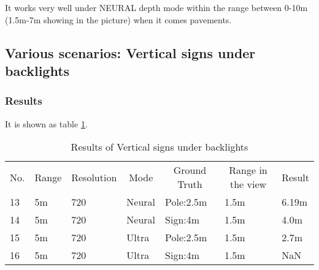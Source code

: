It works very well under NEURAL depth mode within the range between 0-10m (1.5m-7m showing in the picture) when it comes pavements. 

\subsection{Various scenarios: Vertical signs under backlights}

\subsubsection{Results}

It is shown as table \ref{fig:backlights}.

\begin{table}[]
  \begin{tabular}{lllllll}
  \rowcolor[HTML]{4472C4} 
  No. & \multicolumn{1}{c}{\cellcolor[HTML]{4472C4}Range} & \multicolumn{1}{c}{\cellcolor[HTML]{4472C4}Resolution} & \multicolumn{1}{c}{\cellcolor[HTML]{4472C4}Mode} & \multicolumn{1}{c}{\cellcolor[HTML]{4472C4}Ground Truth} & \multicolumn{1}{c}{\cellcolor[HTML]{4472C4}Range in the view} & \multicolumn{1}{c}{\cellcolor[HTML]{4472C4}Result} \\
  13  & 5m                                                & 720                                                    & Neural                                           & Pole:2.5m                                                & 1.5m                                                          & 6.19m                                              \\
  14  & 5m                                                & 720                                                    & Neural                                           & Sign:4m                                                  & 1.5m                                                          & 4.0m                                               \\
  15  & 5m                                                & 720                                                    & Ultra                                            & Pole:2.5m                                                & 1.5m                                                          & 2.7m                                               \\
  16  & 5m                                                & 720                                                    & Ultra                                            & Sign:4m                                                  & 1.5m                                                          & NaN                                               
  \end{tabular}
  \caption{Results of Vertical signs under backlights}
  \label{fig:backlights}
\end{table}

